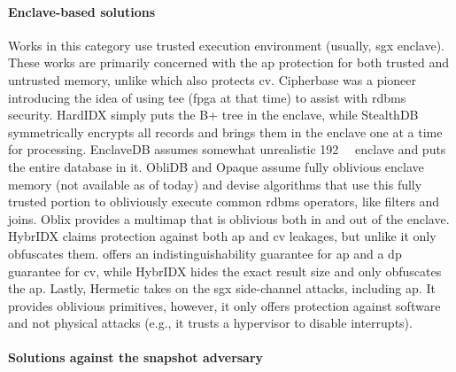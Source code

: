 		\paragraph*{Enclave-based solutions}

			Works in this category use trusted execution environment (usually, \acrshort{sgx} enclave).
			These works are primarily concerned with the \acrshort{ap} protection for both trusted and untrusted memory, unlike \epsolute{} which also protects \acrshort{cv}.
			Cipherbase \cite{cipherbase-daas} was a pioneer introducing the idea of using \acrshort{tee} (\acrshort{fpga} at that time) to assist with \acrshort{rdbms} security.
			HardIDX \cite{hardidx} simply puts the B+ tree in the enclave, while StealthDB \cite{stealth-db} symmetrically encrypts all records and brings them in the enclave one at a time for processing.
			EnclaveDB \cite{enclave-db} assumes somewhat unrealistic \SI{192}{\giga\byte} enclave and puts the entire database in it.
			ObliDB \cite{oblidb} and Opaque \cite{opaque} assume fully oblivious enclave memory (not available as of today) and devise algorithms that use this fully trusted portion to obliviously execute common \acrshort{rdbms} operators, like filters and joins.
			Oblix \cite{oblix} provides a multimap that is oblivious both in and out of the enclave.
			HybrIDX claims protection against both \acrshort{ap} and \acrshort{cv} leakages, but unlike \epsolute{} it only obfuscates them.
			\epsolute{} offers an indistinguishability guarantee for \acrshort{ap} and a \acrshort{dp} guarantee for \acrshort{cv}, while HybrIDX hides the exact result size and only obfuscates the \acrshort{ap}.
			Lastly, Hermetic \cite{hermetic} takes on the \acrshort{sgx} side-channel attacks, including \acrshort{ap}.
			It provides oblivious primitives, however, it only offers protection against software and not physical attacks (e.g., it trusts a hypervisor to disable interrupts).

		\paragraph*{Solutions against the snapshot adversary}

